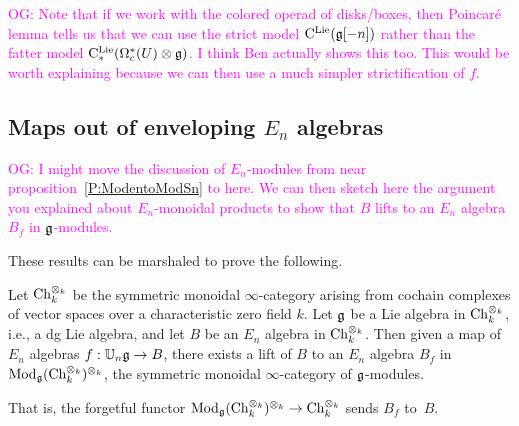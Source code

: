 \documentclass[11pt]{amsart}
\numberwithin{equation}{section}
\def\owen{\textcolor{magenta}{OG: }\textcolor{magenta}}
\begin{document}
\owen{\label{note on little model} Note that if we work with the colored operad of disks/boxes, then Poincar\'e lemma tells us that we can use the strict model ${\rm C}^{\rm Lie}(\mathfrak g[-n])$ rather than the fatter model ${\rm C}^{\rm Lie}_*(\Omega^*_c(U) \otimes \mathfrak g)$. I think Ben actually shows this too. This would be worth explaining because we can then use a much simpler strictification of $f$.}

\subsection{Maps out of enveloping $E_n$ algebras}

\owen{I might move the discussion of $E_n$-modules from near proposition~\ref{P:ModentoModSn} to here. 
We can then sketch here the argument you explained about $E_n$-monoidal products to show that $B$ lifts to an $E_n$ algebra $B_f$ in $\mathfrak g$-modules.}

These results can be marshaled to prove the following.

\begin{prp}
Let ${\rm Ch}_k^{\otimes_k}$ be the symmetric monoidal $\infty$-category arising from cochain complexes of vector spaces over a characteristic zero field $k$.
Let $\mathfrak g$ be a Lie algebra in ${\rm Ch}_k^{\otimes_k}$, i.e., a dg Lie algebra, 
and let $B$ be an $E_n$ algebra in ${\rm Ch}_k^{\otimes_k}$.
Then given a map of $E_n$ algebras $f: \mathbb U_n \mathfrak g \to B$, 
there exists a lift of $B$ to an $E_n$ algebra $B_f$ in ${\rm Mod}_\mathfrak g({\rm Ch}_k^{\otimes_k})^{\otimes_k}$, the symmetric monoidal $\infty$-category of $\mathfrak g$-modules.
\end{prp}

That is, the forgetful functor ${\rm Mod}_\mathfrak g({\rm Ch}_k^{\otimes_k})^{\otimes_k} \to {\rm Ch}_k^{\otimes_k}$ sends $B_f$ to~$B$.
\end{document}
